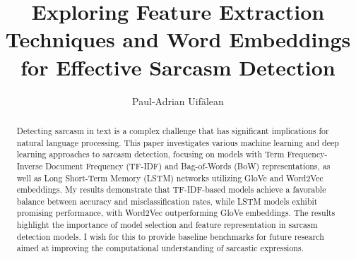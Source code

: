\documentclass[runningheads]{llncs}
\begin{document}
    \title{Exploring Feature Extraction Techniques and Word Embeddings for Effective Sarcasm Detection}

    \author{Paul-Adrian Uif\u{a}lean}

    
    \maketitle 
    
    \begin{abstract}
        Detecting sarcasm in text is a complex challenge that has significant implications for natural language processing. This paper investigates various machine learning and deep 
        learning approaches to sarcasm detection, focusing on models with Term Frequency-Inverse Document Frequency (TF-IDF) and Bag-of-Words (BoW) representations, as well as 
        Long Short-Term Memory (LSTM) networks utilizing GloVe and Word2Vec embeddings. My results demonstrate that TF-IDF-based models achieve a favorable balance between accuracy and 
        misclassification rates, while LSTM models exhibit promising performance, with Word2Vec outperforming GloVe embeddings. The results highlight the importance of model selection and 
        feature representation in sarcasm detection models. I wish for this to provide baseline benchmarks for future research aimed at improving the computational understanding of sarcastic expressions.
    \end{abstract}
    

    
    
    
    
    
    
    
    
    
\end{document}

